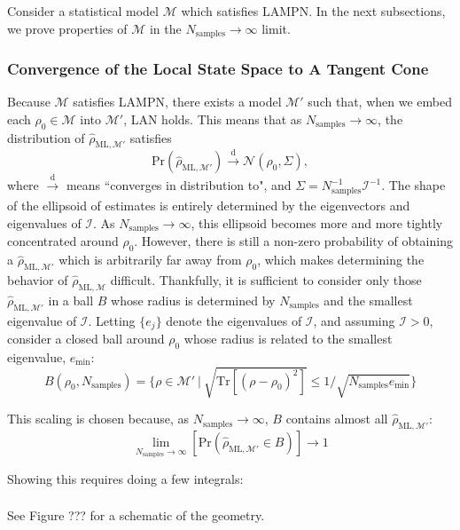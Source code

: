 \documentclass[aps,pra, twocolumn]{revtex4-1}
\newcommand{\M}{\mathcal{M}}
\newcommand{\rhohat}{\hat{\rho}}
\newcommand{\rhoML}[1]{\rhohat_{\scriptscriptstyle{\mathrm{ML},#1}}}
\begin{document}
Consider a statistical model $\M$ which satisfies LAMPN. In the next subsections, we prove properties of $\M$ in the $N_{\mathrm{samples}} \rightarrow \infty$ limit.

\subsubsection{Convergence of the Local State Space to A Tangent Cone}


Because $\M$ satisfies LAMPN, there exists a model $\M'$ such that, when we embed each $\rho_{0} \in \M$ into $\M'$, LAN holds. This means that as $N_{\mathrm{samples}} \rightarrow \infty$, the distribution of $\rhoML{\M'}$ satisfies
\[\mathrm{Pr}(\rhoML{\M'})\xrightarrow[]{\text{d}} \mathcal{N}(\rho_{0}, \Sigma),\]
where $\xrightarrow[]{\text{d}}$ means ``converges in distribution to", and $\Sigma = N^{-1}_{\mathrm{samples}}\mathcal{I}^{-1}$.
The shape of the ellipsoid of estimates is entirely determined by the eigenvectors and eigenvalues of $\mathcal{I}$. As $N_{\mathrm{samples}} \rightarrow \infty$, this ellipsoid becomes more and more tightly concentrated around $\rho_{0}$. However, there is still a non-zero probability of obtaining a $\rhoML{\M'}$ which is arbitrarily far away from $\rho_{0}$, which makes determining the behavior of $\rhoML{\M}$ difficult. Thankfully, it is sufficient to consider only those $\rhoML{\M'}$ in a ball $B$ whose radius is determined by $N_{\mathrm{samples}}$ and the smallest eigenvalue of $\mathcal{I}$. Letting $\{e_{j}\}$ denote the eigenvalues of $\mathcal{I}$, and assuming $\mathcal{I} > 0$, consider a closed ball around $\rho_{0}$ whose radius is related to the smallest eigenvalue, $e_{\min}$:
\[B(\rho_{0}, N_{\mathrm{samples}}) =\{\rho \in \M'~|~\sqrt{\mathrm{Tr}[(\rho - \rho_{0})^{2}]} \leq 1/\sqrt{N_{\mathrm{samples}}e_{\min}}\}\]

This scaling is chosen because, as $N_{\mathrm{samples}} \rightarrow \infty$, $B$ contains almost all $\rhoML{\M'}$:
 \[\lim_{N_{\mathrm{samples}} \rightarrow \infty}\left[\mathrm{Pr}\left(\rhoML{\M'} \in B\right)\right] \rightarrow 1\]

Showing this requires doing a few integrals:
\begin{align*}
\end{align*}
 
 See Figure ??? for a schematic of the geometry.
 
\end{document}
